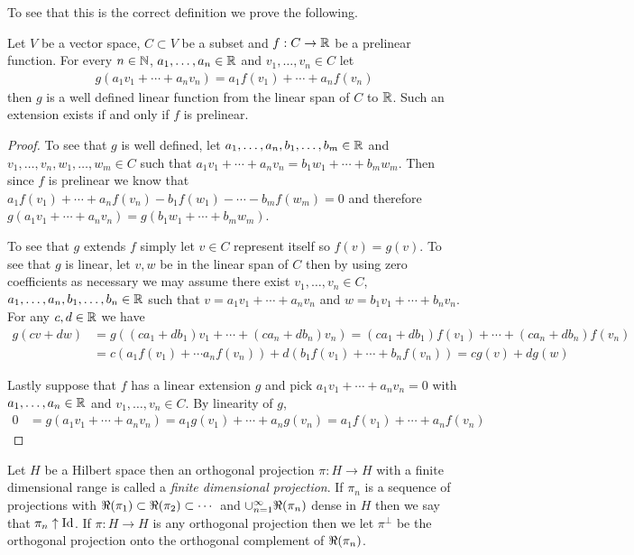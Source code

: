 To see that this is the correct definition we prove the following.
\begin{prop}\label{PrelinearFunctionsAreRestrictionsOfLinear}Let $V$ be a vector space, $C \subset V$ be a subset and $f : C \to \mathbb{R}$ be a prelinear function.  For every $n \in \mathbb{N}$, $a_1, \dotsc, a_n \in \mathbb{R}$ and $v_1, \dotsc, v_n \in C$ let 
\begin{align*}
g(a_1 v_1 + \dotsb + a_n v_n) = a_1 f(v_1) + \dotsb + a_n f(v_n)
\end{align*}
then $g$ is a well defined linear function from the linear span of $C$ to $\mathbb{R}$.  Such an extension exists if and only if $f$ is prelinear.
\end{prop}
\begin{proof}
To see that $g$ is well defined, let $a_1, \dotsc, a_n, b_1, \dotsc, b_m \in \mathbb{R}$ and $v_1, \dotsc, v_n, w_1, \dotsc, w_m \in C$ such that $a_1 v_1 + \dotsb + a_n v_n = b_1 w_1 + \dotsb + b_m w_m$.  Then since $f$ is prelinear we know that $a_1 f(v_1) + \dotsb + a_n f(v_n) - b_1 f(w_1) - \dotsb - b_m f(w_m) = 0$ and therefore $g(a_1 v_1 + \dotsb + a_n v_n) = g(b_1 w_1 + \dotsb + b_m w_m)$.  

To see that $g$ extends $f$ simply let $v \in C$ represent itself so $f(v) = g(v)$.  To see that $g$ is linear, let $v, w$ be in the linear span of $C$ then by using zero coefficients as necessary we may assume there exist $v_1, \dotsc, v_n \in C$, $a_1, \dotsc, a_n, b_1, \dotsc, b_n \in \mathbb{R}$ such that $v = a_1 v_1 + \dotsb + a_n v_n$ and $w = b_1 v_1 + \dotsb + b_n v_n$.  For any $c, d \in \mathbb{R}$ we have
\begin{align*}
g(cv + dw) &= g((ca_1 + d b_1) v_1 + \dotsb + (ca_n + d b_n) v_n) = (ca_1 + d b_1) f(v_1) + \dotsb + (ca_n + d b_n) f(v_n) \\
&= c( a_1 f(v_1) + \dotsb a_n f(v_n)) + d( b_1 f(v_1) + \dotsb + b_nf(v_n)) = c g(v) + d g(w)
\end{align*}

Lastly suppose that $f$ has a linear extension $g$ and pick $a_1 v_1 + \dotsb + a_n v_n = 0$ with $a_1, \dotsc, a_n \in \mathbb{R}$ and $v_1, \dotsc, v_n \in C$.   By linearity of $g$,
\begin{align*}
0 &= g(a_1 v_1 + \dotsb + a_n v_n) = a_1 g(v_1) + \dotsb + a_n g(v_n) = a_1 f(v_1) + \dotsb + a_n f(v_n) 
\end{align*}
\end{proof}


\begin{defn}Let $H$ be a Hilbert space then an orthogonal projection $\pi : H \to H$ with a finite dimensional range is called a \emph{finite dimensional projection}.  If $\pi_n$ is a sequence of projections with $\Re(\pi_1) \subset \Re(\pi_2) \subset \dotsb$ and $\cup_{n=1}^\infty \Re(\pi_n)$ dense in $H$ then we say that $\pi_n \uparrow \operatorname*{Id}$.  If $\pi : H \to H$ is any orthogonal projection then we let $\pi^\perp$ be the orthogonal projection onto the orthogonal complement of $\Re(\pi_n)$.
\end{defn}

